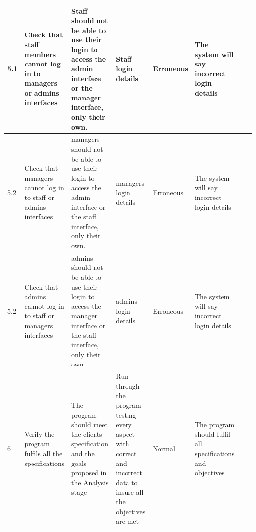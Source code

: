 \begin{landscape}
\begin{center}
\begin{longtable}{|p{1.5cm}|p{2cm}|p{2.5cm}|p{4cm}|p{2cm}|p{2cm}|p{1cm}|p{1.7cm}|}
5.1 & Check that staff members cannot log in to managers or admins interfaces & Staff should not be able to use their login to access the admin interface or the manager interface, only their own. & Staff login details & Erroneous & The system will say incorrect login details && \\ \hline
5.2 & Check that managers cannot log in to staff or admins interfaces & managers should not be able to use their login to access the admin interface or the staff interface, only their own. & managers login details & Erroneous & The system will say incorrect login details && \\ \hline
5.2 & Check that admins cannot log in to staff or managers interfaces & admins should not be able to use their login to access the manager interface or the staff interface, only their own. & admins login details & Erroneous & The system will say incorrect login details && \\ \hline

6 & Verify the program fulfils all the specifications & The program should meet the clients specification and the goals proposed in the Analysis stage & Run through the program testing every aspect with correct and incorrect data to insure all the objectives are met & Normal &The program should fulfil all specifications and objectives && \\ \hline


\end{longtable}
\end{center}
\end{landscape}
